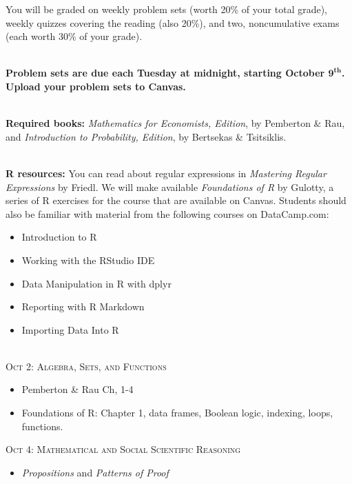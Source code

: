 \documentclass[11pt]{article}
\begin{document}
 You will be graded on weekly problem sets (worth 20\% of your total grade), weekly quizzes covering the reading (also 20\%), and two, noncumulative exams (each worth 30\% of your grade).  

\ \\{\bf Problem sets are due each Tuesday at midnight, starting October $\mathbf{9^{\text{th}}}$.  Upload your problem sets to Canvas.}


\ \\{\bf Required books:} \textit{ Mathematics for Economists,  Edition},  by Pemberton \& Rau, and \textit{Introduction to Probability,  Edition}, by Bertsekas \& Tsitsiklis.

\ \\{\bf R resources:} You can read about regular expressions in \textit{Mastering Regular Expressions} by Friedl.  We will make available \textit{Foundations of R} by Gulotty, a series of R exercises for the course that are available on Canvas.  Students should also be familiar with material from the following courses on DataCamp.com:

\begin{itemize}
\item Introduction to R
\item Working with the RStudio IDE
\item Data Manipulation in R with dplyr
\item Reporting with R Markdown
\item Importing Data Into R
\end{itemize}


\newpage

\ \\ \noindent \textsc{Oct 2: Algebra, Sets, and Functions}

\begin{itemize}
\item Pemberton \& Rau Ch, 1-4

\item Foundations of R: Chapter 1, data frames, Boolean logic, indexing, loops, functions.
\end{itemize}




\noindent \textsc{Oct 4: Mathematical and Social Scientific Reasoning}

\begin{itemize}
\item \emph{Propositions} and \emph{Patterns of Proof}
\end{itemize}
\end{document}
